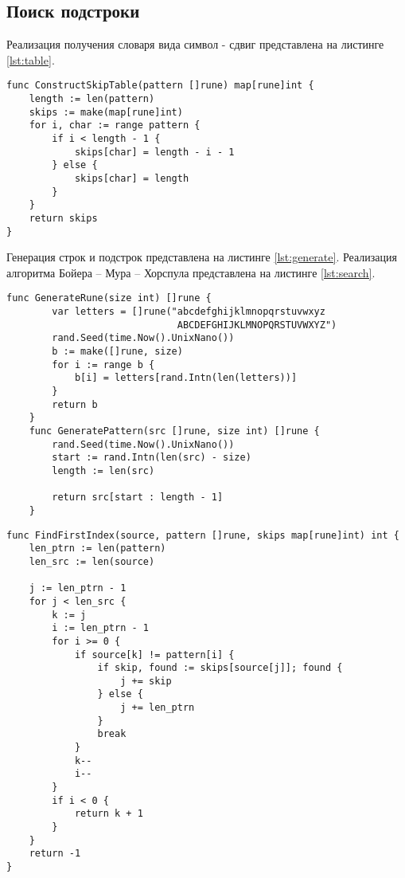 \subsection{Поиск подстроки}
Реализация получения словаря вида символ - сдвиг представлена на листинге \ref{lst:table}.
\begin{lstlisting}[label=lst:table,caption=Получение словаря вида символ - сдвиг]
func ConstructSkipTable(pattern []rune) map[rune]int {
	length := len(pattern)
	skips := make(map[rune]int)
	for i, char := range pattern {
		if i < length - 1 {
			skips[char] = length - i - 1
		} else {
			skips[char] = length
		}
	}
	return skips
}
\end{lstlisting}

Генерация строк и подстрок представлена на листинге \ref{lst:generate}. Реализация алгоритма Бойера -- Мура -- Хорспула представлена на листинге \ref{lst:search}.
\begin{lstlisting}[label=lst:generate,caption=Генерация строк и подстрок]
	func GenerateRune(size int) []rune {
		var letters = []rune("abcdefghijklmnopqrstuvwxyz
							  ABCDEFGHIJKLMNOPQRSTUVWXYZ")
		rand.Seed(time.Now().UnixNano())
		b := make([]rune, size)
		for i := range b {
			b[i] = letters[rand.Intn(len(letters))]
		}
		return b
	}
	func GeneratePattern(src []rune, size int) []rune {
		rand.Seed(time.Now().UnixNano())
		start := rand.Intn(len(src) - size)
		length := len(src)
		
		return src[start : length - 1]
	}
\end{lstlisting}

\begin{lstlisting}[label=lst:search,caption=Алгоритм Бойера -- Мура -- Хорспула]
func FindFirstIndex(source, pattern []rune, skips map[rune]int) int {
	len_ptrn := len(pattern)
	len_src := len(source)
	
	j := len_ptrn - 1
	for j < len_src {
		k := j
		i := len_ptrn - 1
		for i >= 0 {
			if source[k] != pattern[i] {
				if skip, found := skips[source[j]]; found {
					j += skip
				} else {
					j += len_ptrn
				}
				break
			}
			k--
			i--
		}
		if i < 0 {
			return k + 1
		}
	}
	return -1
}
\end{lstlisting}

